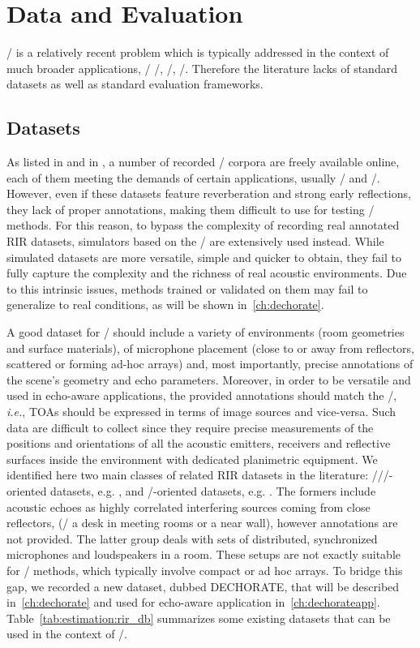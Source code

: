 \section{Data and Evaluation}\label{sec:estimation:datametrics}
\AER/ is a relatively recent problem which is typically addressed in the context of much broader applications, \eg/ \SE/, \RooGE/, \SSL/.
Therefore the literature lacks of standard datasets as well as standard evaluation frameworks.

\subsection{Datasets}\label{sec:estimation:datasets}
As listed in  and in , a number of recorded \RIRs/ corpora are freely available online, each of them meeting the demands of certain applications, usually \SE/ and \ASR/.
However, even if these datasets feature reverberation and strong early reflections, they lack of proper annotations, making them difficult to use for testing \AER/ methods.
For this reason, to bypass the complexity of recording real annotated RIR datasets, simulators based on the \ISM/ are extensively used instead.
While simulated datasets are more versatile, simple and quicker to obtain, they fail to fully capture the complexity and the richness of real acoustic environments.
Due to this intrinsic issues, methods trained or validated on them may fail to generalize to real conditions, as will be shown in~\cref{ch:dechorate}.

\mynewline
A good dataset for \AER/ should include a variety of environments (room geometries and surface materials), of microphone placement (close to or away from reflectors, scattered or forming ad-hoc arrays) and, most importantly, precise annotations of the scene's geometry and echo parameters.
Moreover, in order to be versatile and used in echo-aware applications, the provided annotations should match the \ISM/, \textit{i.e.}, TOAs should be expressed in terms of image sources and vice-versa.
Such data are difficult to collect since they require precise measurements of the positions and orientations of all the acoustic emitters, receivers and reflective surfaces inside the environment with dedicated planimetric equipment.
We identified here two main classes of related RIR datasets in the literature:
\SE//\ASR/-oriented datasets, e.g. , and \RooGE/-oriented datasets, e.g. .
The formers include acoustic echoes as highly correlated interfering sources coming from close reflectors, (\eg/ a desk in meeting rooms or a near wall), however annotations are not provided.
The latter group deals with sets of distributed, synchronized microphones and loudspeakers in a room.
These setups are not exactly suitable for \SE/ methods, which typically involve compact or ad hoc arrays.
To bridge this gap, we recorded a new dataset, dubbed \ac{DECHORATE}, that will be described in~\cref{ch:dechorate} and used for echo-aware application in~\cref{ch:dechorateapp}.
Table~\ref{tab:estimation:rir_db} summarizes some existing datasets that can be used in the context of \AER/.

